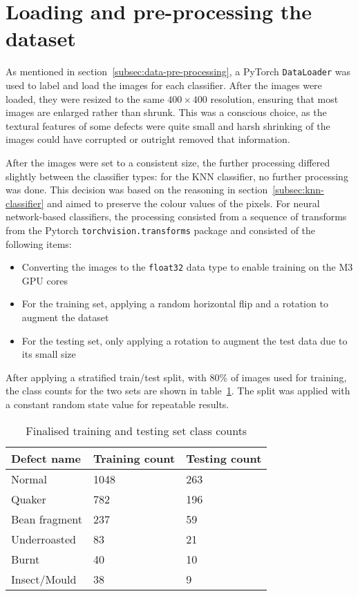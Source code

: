 \section{Loading and pre-processing the dataset}
\label{sec:loading-and-pre-processing-the-dataset}
As mentioned in section~\ref{subsec:data-pre-processing}, a PyTorch \verb|DataLoader| was used to label and load the images
for each classifier.
After the images were loaded, they were resized to the same $400 \times 400$ resolution, ensuring that most images are
enlarged rather than shrunk.
This was a conscious choice, as the textural features of some defects were quite small and harsh shrinking of the images
could have corrupted or outright removed that information.

After the images were set to a consistent size, the further processing differed slightly between the classifier types:
for the KNN classifier, no further processing was done.
This decision was based on the reasoning in section~\ref{subsec:knn-classifier} and aimed to preserve the colour values of the pixels.
For neural network-based classifiers, the processing consisted from a sequence of transforms from the Pytorch \verb|torchvision.transforms|
package and consisted of the following items:
\begin{itemize}
    \item Converting the images to the \verb|float32| data type to enable training on the M3 GPU cores
    \item For the training set, applying a random horizontal flip and a rotation to augment the dataset
    \item For the testing set, only applying a rotation to augment the test data due to its small size
\end{itemize}

After applying a stratified train/test split, with 80\% of images used for training, the class counts for the two sets are
shown in table~\ref{tab:finalTrainTestClassCuts}.
The split was applied with a constant random state value for repeatable results.
\begin{table}[h]
    \centering
    \begin{tabular}{lll}
        \toprule
        \textbf{Defect name} & \textbf{Training count} & \textbf{Testing count} \\
        \midrule
        Normal & 1048 & 263 \\
        Quaker & 782 & 196 \\
        Bean fragment & 237 & 59 \\
        Underroasted & 83 & 21 \\
        Burnt & 40 & 10 \\
        Insect/Mould & 38 & 9 \\
        \bottomrule
    \end{tabular}
    \caption{Finalised training and testing set class counts}
    \label{tab:finalTrainTestClassCuts}
\end{table}


